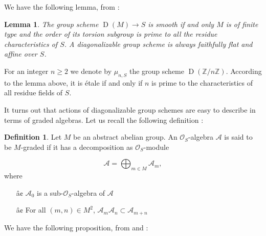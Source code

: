 \documentclass{amsart}
\newtheorem{lemm}{Lemma}[section]
\theoremstyle{definition}
\newtheorem{defi}{Definition}[section]
\theoremstyle{remark}
\begin{document}
We have the following lemma, from \cite[Exp VIII, prop.2.1]{SGA3} :

\begin{lemm}

The group scheme $\operatorname{D}(M) {\longrightarrow} S$ is smooth if and only $M$ is of finite type and the order of its torsion subgroup is prime to all the residue characteristics of $S$. 
A diagonalizable group scheme is always faithfully flat and affine over $S$.

\end{lemm}

For an integer $n \geq 2$ we denote by $\mu_{n,S}$ the group scheme $\operatorname{D}({\mathbb{Z}}/n{\mathbb{Z}})$. According to the lemma above, it is \'etale if and only if $n$ is prime to the characteristics of all residue fields of $S$.

It turns out that actions of diagonalizable group schemes are easy to describe in terms of graded algebras. Let us recall the following definition : 

\begin{defi}

Let $M$ be an abstract abelian group. An ${{\mathcal O}}_S$-algebra ${{\mathcal A}}$ is said to be $M$-graded if it has a decomposition as ${{\mathcal O}}_S$-module

\[ {{\mathcal A}} = \displaystyle\bigoplus_{m \in M} {{\mathcal A}}_m, \] 
where \begin{itemize}
\item[â¢] ${{\mathcal A}}_0$ is a sub-${{\mathcal O}}_S$-algebra of ${{\mathcal A}}$
\item[â¢] For all $(m,n) \in M^2$, ${{\mathcal A}}_m {{\mathcal A}}_n \subset {{\mathcal A}}_{m+n}$

\end{itemize}

\end{defi}

We have the following proposition, from \cite[Exp I, 4.7.3]{SGA3} and \cite[Exp VIII, Prop 4.1-4.6]{sg32} : 
\end{document}
